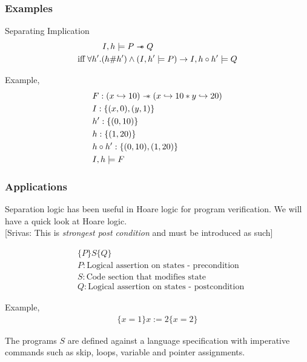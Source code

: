 \documentclass{beamer}
\newcommand\sepimp{\mathrel{-\mkern-6mu*}}
\newcommand{\mscmt}[1]{{\color{blue} [Srivas: {#1}]}}
\begin{document}
\begin{frame}
\frametitle{Examples}
Separating Implication
\begin{align*}
    I,h \models P \sepimp Q \hspace{3.5cm} \\ 
    \textrm{iff} \; \forall h'.(h \# h') \land (I,h' \models P) \to I,h \circ h' \models Q
\end{align*}

Example,
\begin{align*}
    & F : (x \hookrightarrow 10) \sepimp (x \hookrightarrow 10 * y \hookrightarrow 20) \\
    & I : \{(x,0), (y,1)\} \\
    & h' : \{(0,10)\} \\
    & h : \{(1,20) \} \\
    & h \circ h' : \{(0,10), (1,20)\} \\
    & I,h \models F
\end{align*}
\end{frame}

\begin{frame}
\frametitle{Applications}
Separation logic has been useful in Hoare logic for program verification. We will
have a quick look at Hoare logic. \\
\mscmt{\tiny{This is \emph{strongest post condition} and must be introduced as such}}

\begin{align*}
    & \{P\}S\{Q\} \\
    & P : \textrm{Logical assertion on states - precondition} \\
    & S : \textrm{Code section that modifies state} \\
    & Q : \textrm{Logical assertion on states - postcondition}
\end{align*}

Example,
\begin{align*}
    \{x = 1\}x := 2\{x = 2\}
\end{align*}

The programs $S$ are defined against a language specification with 
imperative commands such as skip, loops,
variable and pointer assignments.
\end{frame}
\end{document}
